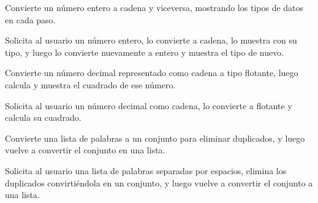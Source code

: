 \documentclass[letterpaper,10pt,spanish]{sphinxmanual}
\begin{document}
\begin{fulllineitems}
\label{\detokenize{pr3:pr3.2_2.convertir_numero}}
\pysigstartsignatures
{}
\pysigstopsignatures
\sphinxAtStartPar
Convierte un número entero a cadena y viceversa, mostrando los tipos de datos en cada paso.

\sphinxAtStartPar
Solicita al usuario un número entero, lo convierte a cadena, lo muestra con su tipo,
y luego lo convierte nuevamente a entero y muestra el tipo de nuevo.

\end{fulllineitems}


\begin{fulllineitems}
\label{\detokenize{pr3:pr3.2_2.convertir_y_calcular_cuadrado}}
\pysigstartsignatures
{}
\pysigstopsignatures
\sphinxAtStartPar
Convierte un número decimal representado como cadena a tipo flotante,
luego calcula y muestra el cuadrado de ese número.

\sphinxAtStartPar
Solicita al usuario un número decimal como cadena, lo convierte a flotante y calcula su cuadrado.

\end{fulllineitems}


\begin{fulllineitems}
\label{\detokenize{pr3:pr3.2_2.eliminar_duplicados}}
\pysigstartsignatures
{}
\pysigstopsignatures
\sphinxAtStartPar
Convierte una lista de palabras a un conjunto para eliminar duplicados,
y luego vuelve a convertir el conjunto en una lista.

\sphinxAtStartPar
Solicita al usuario una lista de palabras separadas por espacios, elimina los duplicados
convirtiéndola en un conjunto, y luego vuelve a convertir el conjunto a una lista.

\end{fulllineitems}
\end{document}
